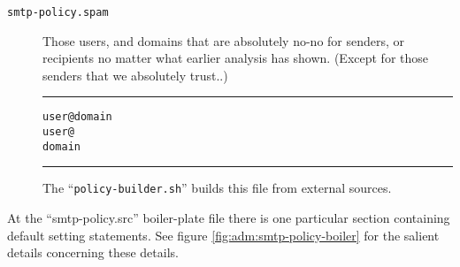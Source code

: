 \begin{description}
\item[\tt smtp-policy.spam] \mbox{}

Those users, and domains that are absolutely no-no for senders,
or recipients no matter what earlier analysis has shown.
(Except for those senders that we absolutely trust..)

\begin{alltt}\medskip\hrule\medskip
 user@domain
 user@
 domain
\medskip\hrule\end{alltt}\medskip

The ``{\tt policy-builder.sh}'' builds this file from external sources. 

\end{description}



At the ``smtp-policy.src'' boiler-plate file there is one
particular section containing default setting statements.
See figure \vref{fig:adm:smtp-policy-boiler} for the salient
details concerning these details.

